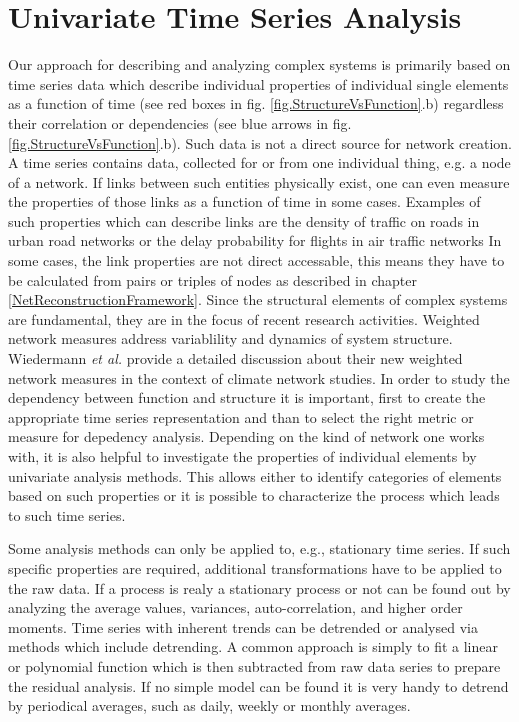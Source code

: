 \documentclass[a4paper,10pt]{scrbook}
\begin{document}
\section{Univariate Time Series Analysis}
Our approach for describing and analyzing complex systems is primarily based on time series data which describe individual properties of individual single elements as a function of time (see red boxes in fig. \ref{fig.StructureVsFunction}.b) regardless their correlation or dependencies (see blue arrows in fig. \ref{fig.StructureVsFunction}.b). Such data is not a direct source for network creation. A time series contains data, collected for or from one individual thing, e.g. a node of a network. If links between such entities  physically exist, one can even measure the properties of those links as a function of time in some cases. Examples of such properties which can describe links are the density of traffic on roads in urban road networks 
or the delay probability for flights in air traffic networks 
In some cases, the link properties are not direct accessable, this means they have to be calculated from pairs or triples of nodes as described in chapter \ref{NetReconstructionFramework}. 
Since the structural elements of complex systems are fundamental, they are in the focus of recent research activities. Weighted network measures address variablility and dynamics of system structure. Wiedermann \textit{et al.} \cite{Wiedermann2013} provide a detailed discussion about their new weighted network measures in the context of climate network studies.
In order to study the dependency between function and structure it is important, first to create the appropriate time series representation and than to select the right metric or measure for depedency analysis. Depending on the kind of network one works with, it is also helpful to investigate the properties of individual elements by univariate analysis methods. This allows either to identify categories of elements based on such properties or it is possible to characterize the process which leads to such time series. 

Some analysis methods can only be applied to, e.g., stationary time series. If such specific properties are required, additional transformations have to be applied to the raw data. If a process is realy a stationary process or not can be found out by analyzing the average values, variances, auto-correlation, and higher order moments. Time series with inherent trends can be detrended or analysed via methods which include detrending. A common approach is simply to fit a linear or polynomial function which is then subtracted from raw data series to prepare the residual analysis. If no simple model can be found it is very handy to detrend by periodical averages, such as daily, weekly or monthly averages.
\end{document}
